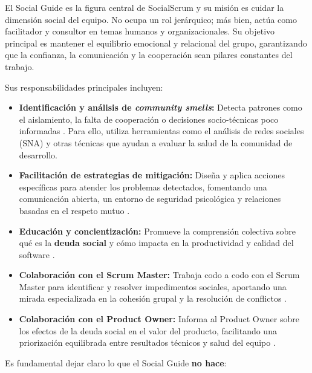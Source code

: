 El Social Guide es la figura central de SocialScrum y su misión es cuidar la dimensión social del equipo. No ocupa un rol jerárquico; más bien, actúa como facilitador y consultor en temas humanos y organizacionales. Su objetivo principal es mantener el equilibrio emocional y relacional del grupo, garantizando que la confianza, la comunicación y la cooperación sean pilares constantes del trabajo.

Sus responsabilidades principales incluyen:

\begin{itemize}
    \item \textbf{Identificación y análisis de \textit{community smells}:} Detecta patrones como el aislamiento, la falta de cooperación o decisiones socio-técnicas poco informadas \cite{saeeda2024nontechnicaldebt}. Para ello, utiliza herramientas como el análisis de redes sociales (SNA) y otras técnicas que ayudan a evaluar la salud de la comunidad de desarrollo.

    \item \textbf{Facilitación de estrategias de mitigación:} Diseña y aplica acciones específicas para atender los problemas detectados, fomentando una comunicación abierta, un entorno de seguridad psicológica y relaciones basadas en el respeto mutuo \cite{saeeda2024nontechnicaldebt, martini2019agiledebt}.

    \item \textbf{Educación y concientización:} Promueve la comprensión colectiva sobre qué es la \textbf{deuda social} y cómo impacta en la productividad y calidad del software \cite{tamburri2015insights}.

    \item \textbf{Colaboración con el Scrum Master:} Trabaja codo a codo con el Scrum Master para identificar y resolver impedimentos sociales, aportando una mirada especializada en la cohesión grupal y la resolución de conflictos \cite{schwaber2020scrum}.

    \item \textbf{Colaboración con el Product Owner:} Informa al Product Owner sobre los efectos de la deuda social en el valor del producto, facilitando una priorización equilibrada entre resultados técnicos y salud del equipo \cite{saeeda2024nontechnicaldebt, tulili2022burnout}.
\end{itemize}

Es fundamental dejar claro lo que el Social Guide \textbf{no hace}:

